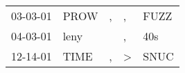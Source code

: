 \begin{supertabular}{p{0.07\textwidth}p{0.06\textwidth}p{0.02\textwidth}p{0.02\textwidth}p{0.06\textwidth}}
 03-03-01\textsuperscript{} &  PROW\textsuperscript{} &  , &             , &  FUZZ\textsuperscript{} \\
 04-03-01\textsuperscript{} &  leny\textsuperscript{} &    &             , &   40s\textsuperscript{} \\
 12-14-01\textsuperscript{} &  TIME\textsuperscript{} &  , &  \textgreater &  SNUC\textsuperscript{} \\
\end{supertabular}
